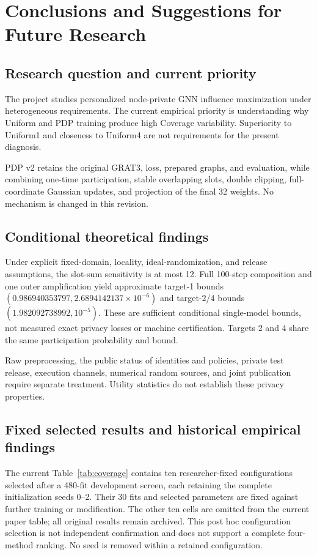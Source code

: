 \chapter{Conclusions and Suggestions for Future Research}\label{ch:conclusion}
\section{Research question and current priority}
The project studies personalized node-private GNN influence maximization under heterogeneous requirements. The current empirical priority is understanding why Uniform and PDP training produce high Coverage variability. Superiority to Uniform1 and closeness to Uniform4 are not requirements for the present diagnosis.

PDP v2 retains the original GRAT3, loss, prepared graphs, and evaluation, while combining one-time participation, stable overlapping slots, double clipping, full-coordinate Gaussian updates, and projection of the final 32 weights. No mechanism is changed in this revision.

\section{Conditional theoretical findings}
Under explicit fixed-domain, locality, ideal-randomization, and release assumptions, the slot-sum sensitivity is at most 12. Full 100-step composition and one outer amplification yield approximate target-1 bounds $(0.986940353797,2.6894142137\times10^{-6})$ and target-2/4 bounds $(1.982092738992,10^{-5})$. These are sufficient conditional single-model bounds, not measured exact privacy losses or machine certification. Targets 2 and 4 share the same participation probability and bound.

Raw preprocessing, the public status of identities and policies, private test release, execution channels, numerical random sources, and joint publication require separate treatment. Utility statistics do not establish these privacy properties.

\section{Fixed selected results and historical empirical findings}
The current Table~\ref{tab:coverage} contains ten researcher-fixed configurations selected after a 480-fit development screen, each retaining the complete initialization seeds 0--2. Their 30 fits and selected parameters are fixed against further training or modification. The other ten cells are omitted from the current paper table; all original results remain archived. This post hoc configuration selection is not independent confirmation and does not support a complete four-method ranking. No seed is removed within a retained configuration.

